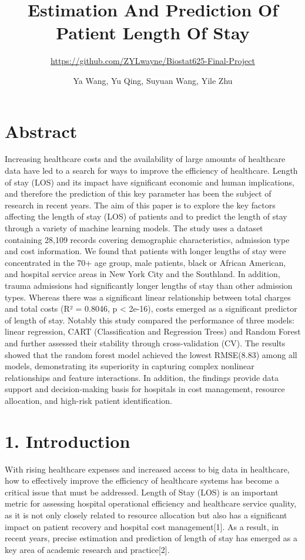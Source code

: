 \documentclass[
  10pt,
]{article}
\title{Estimation And Prediction Of Patient Length Of Stay}
\subtitle{\url{https://github.com/ZYLwayne/Biostat625-Final-Project}}
\author{Ya Wang, Yu Qing, Suyuan Wang, Yile Zhu}
\date{}
\begin{document}
\maketitle

\section{Abstract}\label{abstract}

Increasing healthcare costs and the availability of large amounts of
healthcare data have led to a search for ways to improve the efficiency
of healthcare. Length of stay (LOS) and its impact have significant
economic and human implications, and therefore the prediction of this
key parameter has been the subject of research in recent years. The aim
of this paper is to explore the key factors affecting the length of stay
(LOS) of patients and to predict the length of stay through a variety of
machine learning models. The study uses a dataset containing 28,109
records covering demographic characteristics, admission type and cost
information. We found that patients with longer lengths of stay were
concentrated in the 70+ age group, male patients, black or African
American, and hospital service areas in New York City and the Southland.
In addition, trauma admissions had significantly longer lengths of stay
than other admission types. Whereas there was a significant linear
relationship between total charges and total costs (R² = 0.8046, p
\textless{} 2e-16), costs emerged as a significant predictor of length
of stay. Notably this study compared the performance of three models:
linear regression, CART (Classification and Regression Trees) and Random
Forest and further assessed their stability through cross-validation
(CV). The results showed that the random forest model achieved the
lowest RMSE(8.83) among all models, demonstrating its superiority in
capturing complex nonlinear relationships and feature interactions. In
addition, the findings provide data support and decision-making basis
for hospitals in cost management, resource allocation, and high-risk
patient identification.

\section{1. Introduction}\label{introduction}

With rising healthcare expenses and increased access to big data in
healthcare, how to effectively improve the efficiency of healthcare
systems has become a critical issue that must be addressed. Length of
Stay (LOS) is an important metric for assessing hospital operational
efficiency and healthcare service quality, as it is not only closely
related to resource allocation but also has a significant impact on
patient recovery and hospital cost management{[}1{]}. As a result, in
recent years, precise estimation and prediction of length of stay has
emerged as a key area of academic research and practice{[}2{]}.
\end{document}
